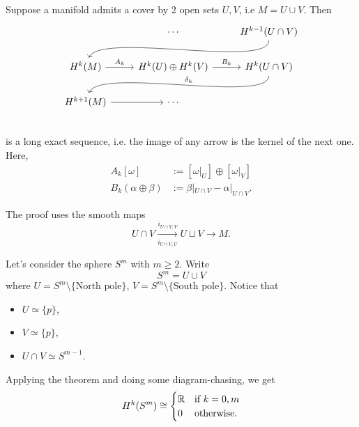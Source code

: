 \begin{theorem}
    Suppose a manifold admits a cover by 2 open sets $U, V$, i.e $M = U \cup V$.
    Then
    \[
        \begin{tikzcd}
        & \cdots & H^{k-1}(U \cap V) \arrow[dll, in=70, out=-90, looseness=0.4]\\
            H^{k}(M) \arrow[r, "A_k"] & H^{k}(U)  \oplus H^{k}(V)  \arrow[r, "B_k"] & H^{k}(U \cap V) \arrow[dll, "\delta_k", in=70, out=-90, looseness=0.4, swap]\\
            H^{k+1}(M) \arrow[r, ""] &\cdots &\\
        \end{tikzcd}
    \]
    is a long exact sequence, i.e. the image of any arrow is the kernel of the next one. Here, 
    \begin{align*}
        A_k[\omega] &:= [\omega|_U] \oplus [\omega|_V]\\
        B_k(\alpha \oplus \beta) &:= \beta|_{U \cap V} - \alpha|_{U \cap V}
    .\end{align*}
\end{theorem}
\begin{remark}
  The proof uses the smooth maps
    \[
    U \cap  V \xrightarrow[i_{U \cap  V, U}]{i_{U \cap  V, V}} U \sqcup V \to  M
    .\] 

\end{remark} 
\begin{eg}
    Let's consider the sphere $S^{m}$ with $m \ge 2$.
    Write $$S^{m} = U \cup  V$$ where $U=S^{m}\setminus\{\text{North pole}\}$, $V=S^{m}\setminus\{\text{South pole}\}$.
    Notice that
    \begin{itemize}
\item $U \simeq  \{p\}$,
\item $V \simeq  \{p\}$,
\item $U\cap V \simeq  S^{m-1}$.
\end{itemize}
    Applying the theorem and doing some diagram-chasing, we get
    \[
        H^{k}(S^{m}) \cong 
        \begin{cases}
            \mathbb{R} & \text{if $k = 0, m$}\\
            0 & \text{otherwise}.
        \end{cases}
    \] 
\end{eg}
